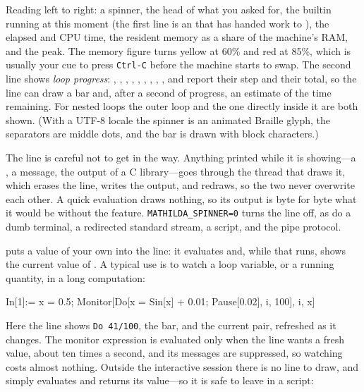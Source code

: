 \noindent
Reading left to right: a spinner, the head of what you asked for, the builtin
running at this moment (the first line is an  that has handed work to
), the elapsed and CPU time, the resident memory as a share of the
machine's RAM, and the peak. The memory figure turns yellow at 60\% and red at 85\%,
which is usually your cue to press \texttt{Ctrl-C} before the machine starts to
swap. The second line shows \emph{loop progress}:
, , , , , , ,
, , and  report their step and their total,
so the line can draw a bar and, after a second of progress, an estimate of the time
remaining. For nested loops the outer loop and the one directly inside it are both
shown. (With a UTF-8 locale the spinner is an animated Braille glyph, the separators
are middle dots, and the bar is drawn with block characters.)

The line is careful not to get in the way. Anything printed while it is showing---a
, a message, the output of a C library---goes through the thread that
draws it, which erases the line, writes the output, and redraws, so the two never
overwrite each other. A quick evaluation draws nothing, so its output is byte for
byte what it would be without the feature. \texttt{MATHILDA\_SPINNER=0} turns the
line off, as do a dumb terminal, a redirected standard stream, a script, and the
pipe protocol.

%
 puts a value of your own into the line: it evaluates
 and, while that runs, shows the current value of . A
typical use is to watch a loop variable, or a running quantity, in a long
computation:

\begin{shell}
In[1]:= x = 0.5; Monitor[Do[x = Sin[x] + 0.01; Pause[0.02], {i, 100}], {i, x}]
\end{shell}

\noindent
Here the line shows \texttt{Do 41/100}, the bar, and the current
 pair, refreshed as it changes. The monitor expression is
evaluated only when the line wants a fresh value, about ten times a second, and its
messages are suppressed, so watching costs almost nothing. Outside the interactive
session there is no line to draw, and  simply evaluates
 and returns its value---so it is safe to leave in a script:

\begin{codepairs}
\end{codepairs}

